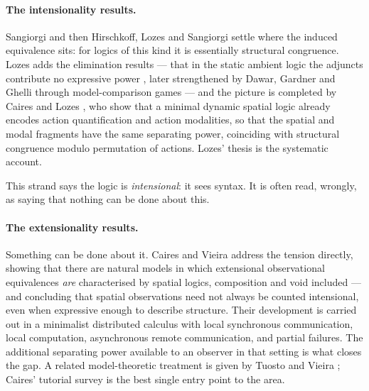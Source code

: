 \documentclass[11pt]{article}
\theoremstyle{plain}
\theoremstyle{definition}
\begin{document}
\paragraph{The intensionality results.} Sangiorgi \cite{SangiorgiExtInt} and then Hirschkoff, Lozes
and Sangiorgi \cite{HLS02,HLS03} settle where the induced equivalence sits: for logics of this kind
it is essentially structural congruence. Lozes adds the elimination results --- that in the static
ambient logic the adjuncts contribute no expressive power \cite{LozesAdjunct}, later strengthened by
Dawar, Gardner and Ghelli through model-comparison games \cite{DGG} --- and the picture is completed
by Caires and Lozes \cite{CairesLozes}, who show that a minimal dynamic spatial logic already encodes
action quantification and action modalities, so that the spatial and modal fragments have the same
separating power, coinciding with structural congruence modulo permutation of actions. Lozes' thesis
\cite{LozesThesis} is the systematic account.

This strand says the logic is \emph{intensional}: it sees syntax. It is often read, wrongly, as
saying that nothing can be done about this.

\paragraph{The extensionality results.} Something can be done about it. Caires and Vieira
\cite{CairesVieira} address the tension directly, showing that there are natural models in which
extensional observational equivalences \emph{are} characterised by spatial logics, composition and
void included --- and concluding that spatial observations need not always be counted intensional,
even when expressive enough to describe structure. Their development is carried out in a minimalist
distributed calculus with local synchronous communication, local computation, asynchronous remote
communication, and partial failures. The additional separating power available to an observer in that
setting is what closes the gap. A related model-theoretic treatment is given by Tuosto and Vieira
\cite{TuostoVieira}; Caires' tutorial survey \cite{CairesSurvey} is the best single entry point to the
area.
\end{document}
